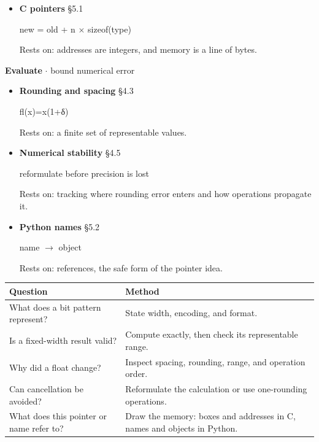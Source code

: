 \documentclass[11pt]{article}
\begin{document}
\begin{keepsection}
\begin{itemize}
Rests on: sign, biased exponent, and finite precision.

\item 
{}
\textbf{C pointers} \hfill{\small\color{FAUblue}§5.1}

new = old + n \ensuremath{\times} sizeof(type)

Rests on: addresses are integers, and memory is a line of bytes.

\end{itemize}

\textbf{Evaluate} \ensuremath{\cdot} bound numerical error

\begin{itemize}
\item 
{}
\textbf{Rounding and spacing} \hfill{\small\color{FAUblue}§4.3}

fl(x)=x(1+δ)

Rests on: a finite set of representable values.

\item 
{}
\textbf{Numerical stability} \hfill{\small\color{FAUblue}§4.5}

reformulate before precision is lost

Rests on: tracking where rounding error enters and how operations propagate it.

\item 
{}
\textbf{Python names} \hfill{\small\color{FAUblue}§5.2}

name \ensuremath{\to} object

Rests on: references, the safe form of the pointer idea.

\end{itemize}

\begin{center}\small\begin{tabularx}{\linewidth}{>{\raggedright\arraybackslash}X>{\raggedright\arraybackslash}X}\toprule
\textbf{Question} & \textbf{Method} \\ \midrule
What does a bit pattern represent? & State width, encoding, and format. \\
Is a fixed-width result valid? & Compute exactly, then check its representable range. \\
Why did a float change? & Inspect spacing, rounding, range, and operation order. \\
Can cancellation be avoided? & Reformulate the calculation or use one-rounding operations. \\
What does this pointer or name refer to? & Draw the memory: boxes and addresses in C, names and objects in Python. \\
\bottomrule\end{tabularx}\end{center}
\end{keepsection}
\end{document}
